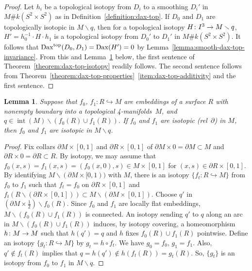 \documentclass[11pt]{amsart}
\def\to{\mathchoice{\longrightarrow}{\rightarrow}{\rightarrow}{\rightarrow}}
\newtheorem{lemma}[theorem]{Lemma}
\theoremstyle{definition}
\theoremstyle{theorem-giventitle}
\theoremstyle{definition-giventitle}
\numberwithin{equation}{section}
\def\inte{\operatorname{int}}
\def\top{\mathrm{top}}
\def\Dax{\operatorname{Dax}}
\def\setminus{\smallsetminus}
\begin{document}
\begin{proof}
  Let $h_i$ be a topological isotopy from $D_i$ to a smoothing $D_i'$ in $M\#k(S^2\times S^2)$ as in Definition~\ref{definition:dax-top}.
  If $D_0$ and $D_1$ are topologically isotopic in $M\setminus q$, then for a topological isotopy $H\colon I^3\to M\setminus q$, $H'=h_0^{-1}\cdot H \cdot h_1$ is a topological isotopy from $D_0'$ to $D_1'$ in $M\#k(S^2\times S^2)$.
  It follows that $\Dax^{\smash{\top}}(D_0,D_1) = \Dax(H')=0$ by Lemma~\ref{lemma:smooth-dax-top-invariance}.
  From this and Lemma~\ref{lemma:isotopy-avoiding-points} below, the first sentence of Theorem~\ref{theorem:dax-top-isotopy} readily follows.
  The second sentence follows from Theorem~\ref{theorem:dax-top-properties}~\ref{item:dax-top-additivity} and the first sentence.
\end{proof}

\begin{lemma}
  \label{lemma:isotopy-avoiding-points}
  Suppose that $f_0$, $f_1\colon R\hookrightarrow M$ are embeddings of a surface $R$ with nonempty boundary into a topological 4-manifolds~$M$, and $q \in \inte(M)\setminus (f_0(R)\cup f_1(R))$.
  If $f_0$ and $f_1$ are isotopic (rel~$\partial$) in $M$, then $f_0$ and $f_1$ are isotopic in $M\setminus q$.
\end{lemma}

\begin{proof}
  Fix collars $\partial M\times[0,1]$ and $\partial R\times[0,1]$ of $\partial M\times 0=\partial M \subset M$ and $\partial R\times 0 = \partial R \subset R$.
  By isotopy, we may assume that $f_0(x,s)=f_1(x,s)=(f_0(x,0),s)\in M\times[0,1]$ for $(x,s)\in \partial R\times[0,1]$.
  By identifying $M\setminus (\partial M\times [0,1))$ with $M$, there is an isotopy $\{f_t\colon R\hookrightarrow M\}$ from $f_0$ to $f_1$ such that $f_t=f_0$ on $\partial R\times[0,1]$ and $f_t(R\setminus (\partial R\times[0,1])) \subset M\setminus (\partial M\times[0,1])$.
  Choose $q'$ in $(\partial M\times \frac12) \setminus f_0(R)$.
  Since $f_0$ and $f_1$ are locally flat embeddings, $M\setminus (f_0(R)\cup f_1(R))$ is connected.
  An isotopy sending $q'$ to $q$ along an arc in $M\setminus (f_0(R)\cup f_1(R))$ induces, by isotopy covering, a homeomorphism $h\colon M\to M$ such that $h(q')=q$ and $h$ fixes $f_0(R) \cup f_1(R)$ pointwise.
  Define an isotopy $\{g_t\colon R \hookrightarrow M\}$ by $g_t = h \circ f_t$.
  We have $g_0=f_0$, $g_1=f_1$.
  Also, $q'\notin f_t(R)$ implies that $q=h(q') \notin h(f_t(R)) = g_t(R)$.
  So, $\{g_t\}$ is an isotopy from $f_0$ to $f_1$ in $M\setminus q$.
\end{proof}
\end{document}
